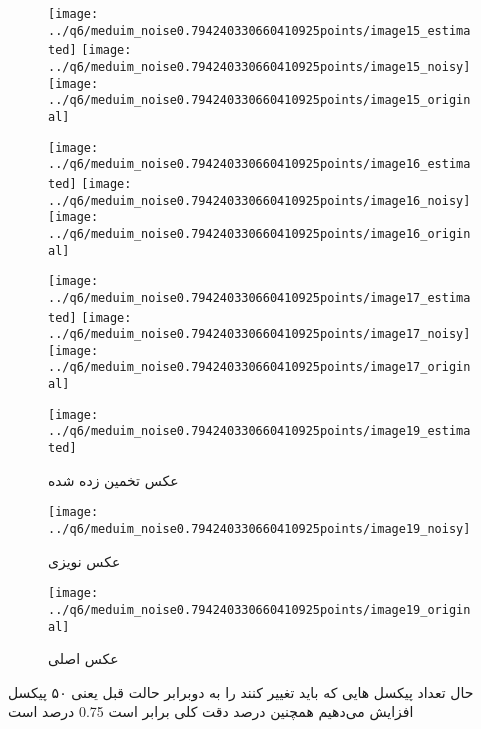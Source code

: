 \documentclass[a4paper,12pt]{article}
\begin{document}
\begin{figure}[!htb]
  \texttt{[image: ../q6/meduim\_noise0.794240330660410925points/image15\_estimated]}
\endminipage\hfill
{}
  \texttt{[image: ../q6/meduim\_noise0.794240330660410925points/image15\_noisy]}
\endminipage\hfill
{}
  \texttt{[image: ../q6/meduim\_noise0.794240330660410925points/image15\_original]}
\endminipage\hfill

  \texttt{[image: ../q6/meduim\_noise0.794240330660410925points/image16\_estimated]}
\endminipage\hfill
{}
  \texttt{[image: ../q6/meduim\_noise0.794240330660410925points/image16\_noisy]}
\endminipage\hfill
{}
  \texttt{[image: ../q6/meduim\_noise0.794240330660410925points/image16\_original]}
\endminipage\hfill

  \texttt{[image: ../q6/meduim\_noise0.794240330660410925points/image17\_estimated]}
\endminipage\hfill
{}
  \texttt{[image: ../q6/meduim\_noise0.794240330660410925points/image17\_noisy]}
\endminipage\hfill
{}
  \texttt{[image: ../q6/meduim\_noise0.794240330660410925points/image17\_original]}
\endminipage\hfill

  \texttt{[image: ../q6/meduim\_noise0.794240330660410925points/image19\_estimated]}
  \caption{  عکس تخمین زده شده }
\endminipage\hfill
{}
  \texttt{[image: ../q6/meduim\_noise0.794240330660410925points/image19\_noisy]}
  \caption{  عکس نویزی }
\endminipage\hfill
{}
  \texttt{[image: ../q6/meduim\_noise0.794240330660410925points/image19\_original]}
  \caption{  عکس اصلی }
\endminipage\hfill
\end{figure}


\newpage
حال تعداد پیکسل هایی که باید تغییر کنند را به دوبرابر حالت قبل یعنی ۵۰ پیکسل افزایش می‌دهیم همچنین درصد دقت کلی برابر است 0.75 درصد است
\end{document}

